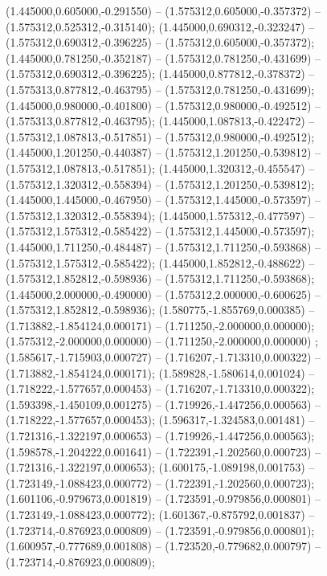  (1.445000,0.605000,-0.291550) -- (1.575312,0.605000,-0.357372) -- (1.575312,0.525312,-0.315140);
 (1.445000,0.690312,-0.323247) -- (1.575312,0.690312,-0.396225) -- (1.575312,0.605000,-0.357372);
 (1.445000,0.781250,-0.352187) -- (1.575312,0.781250,-0.431699) -- (1.575312,0.690312,-0.396225);
 (1.445000,0.877812,-0.378372) -- (1.575313,0.877812,-0.463795) -- (1.575312,0.781250,-0.431699);
 (1.445000,0.980000,-0.401800) -- (1.575312,0.980000,-0.492512) -- (1.575313,0.877812,-0.463795);
 (1.445000,1.087813,-0.422472) -- (1.575312,1.087813,-0.517851) -- (1.575312,0.980000,-0.492512);
 (1.445000,1.201250,-0.440387) -- (1.575312,1.201250,-0.539812) -- (1.575312,1.087813,-0.517851);
 (1.445000,1.320312,-0.455547) -- (1.575312,1.320312,-0.558394) -- (1.575312,1.201250,-0.539812);
 (1.445000,1.445000,-0.467950) -- (1.575312,1.445000,-0.573597) -- (1.575312,1.320312,-0.558394);
 (1.445000,1.575312,-0.477597) -- (1.575312,1.575312,-0.585422) -- (1.575312,1.445000,-0.573597);
 (1.445000,1.711250,-0.484487) -- (1.575312,1.711250,-0.593868) -- (1.575312,1.575312,-0.585422);
 (1.445000,1.852812,-0.488622) -- (1.575312,1.852812,-0.598936) -- (1.575312,1.711250,-0.593868);
 (1.445000,2.000000,-0.490000) -- (1.575312,2.000000,-0.600625) -- (1.575312,1.852812,-0.598936);
 (1.580775,-1.855769,0.000385) -- (1.713882,-1.854124,0.000171) -- (1.711250,-2.000000,0.000000);
 (1.575312,-2.000000,0.000000) -- (1.711250,-2.000000,0.000000) ;
 (1.585617,-1.715903,0.000727) -- (1.716207,-1.713310,0.000322) -- (1.713882,-1.854124,0.000171);
 (1.589828,-1.580614,0.001024) -- (1.718222,-1.577657,0.000453) -- (1.716207,-1.713310,0.000322);
 (1.593398,-1.450109,0.001275) -- (1.719926,-1.447256,0.000563) -- (1.718222,-1.577657,0.000453);
 (1.596317,-1.324583,0.001481) -- (1.721316,-1.322197,0.000653) -- (1.719926,-1.447256,0.000563);
 (1.598578,-1.204222,0.001641) -- (1.722391,-1.202560,0.000723) -- (1.721316,-1.322197,0.000653);
 (1.600175,-1.089198,0.001753) -- (1.723149,-1.088423,0.000772) -- (1.722391,-1.202560,0.000723);
 (1.601106,-0.979673,0.001819) -- (1.723591,-0.979856,0.000801) -- (1.723149,-1.088423,0.000772);
 (1.601367,-0.875792,0.001837) -- (1.723714,-0.876923,0.000809) -- (1.723591,-0.979856,0.000801);
 (1.600957,-0.777689,0.001808) -- (1.723520,-0.779682,0.000797) -- (1.723714,-0.876923,0.000809);
